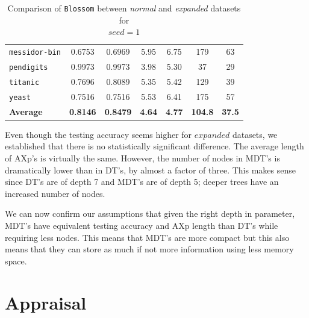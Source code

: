 \documentclass[12pt]{report}
\theoremstyle{definition}
\theoremstyle{definition}
\theoremstyle{definition}
\begin{document}
\begin{table}[ht]
{\begin{tabular}{lcccccc}
    \multicolumn{1}{l}{\tt messidor-bin}  & \multicolumn{1}{c}{0.6753} & \multicolumn{1}{c}{0.6969} & \multicolumn{1}{c}{5.95} & \multicolumn{1}{c}{6.75} & \multicolumn{1}{c}{179} & \multicolumn{1}{c}{63} \\
    \multicolumn{1}{l}{\tt pendigits}     & \multicolumn{1}{c}{0.9973} & \multicolumn{1}{c}{0.9973} & \multicolumn{1}{c}{3.98} & \multicolumn{1}{c}{5.30} & \multicolumn{1}{c}{ 37} & \multicolumn{1}{c}{29} \\
    \multicolumn{1}{l}{\tt titanic}       & \multicolumn{1}{c}{0.7696} & \multicolumn{1}{c}{0.8089} & \multicolumn{1}{c}{5.35} & \multicolumn{1}{c}{5.42} & \multicolumn{1}{c}{129} & \multicolumn{1}{c}{39} \\
    \multicolumn{1}{l}{\tt yeast}         & \multicolumn{1}{c}{0.7516} & \multicolumn{1}{c}{0.7516} & \multicolumn{1}{c}{5.53} & \multicolumn{1}{c}{6.41} & \multicolumn{1}{c}{175} & \multicolumn{1}{c}{57} \\
    \hline
    \multicolumn{1}{l}{\bf Average}       & \multicolumn{1}{c}{\bf 0.8146} & \multicolumn{1}{c}{\bf 0.8479} & \multicolumn{1}{c}{\bf 4.64} & \multicolumn{1}{c}{\bf 4.77} & \multicolumn{1}{c}{\bf 104.8} & \multicolumn{1}{c}{\bf 37.5} \\
    \hline
    \end{tabular}}
    \caption{Comparison of \texttt{Blossom} between \textit{normal} and \textit{expanded} datasets for \\ $seed=1$}
    \label{fig:comparison}
\end{table}

Even though the testing accuracy seems higher for $expanded$ datasets, we established that there is no statistically significant difference. The average length of AXp's is virtually the same. However, the number of nodes in MDT's is dramatically lower than in DT's, by almost a factor of three. This makes sense since DT's are of depth 7 and MDT's are of depth 5; deeper trees have an increased number of nodes.

We can now confirm our assumptions that given the right depth in parameter, MDT's have equivalent testing accuracy and AXp length than DT's while requiring less nodes. This means that MDT's are more compact but this also means that they can store as much if not more information using less memory space.



\chapter{Appraisal}
\end{document}
